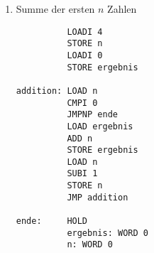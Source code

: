\documentclass{lehramt-informatik-haupt}
\begin{document}
\begin{enumerate}
\begin{enumerate}
\begin{multicols}{2}
\liSpaltenUmbruch
{}

\begin{verbatim}
PROGRAM groesser;
VAR x, y, ergebnis;
BEGIN
  IF x > y THEN
    ergebnis := 1;
  ELSE
    ergebnis := 0;
  END
END groesser.
\end{verbatim}
\vfill\strut
\end{multicols}

%

\item Bestimmung, ob eine Zahl gerade ist oder nicht.

\begin{multicols}{2}

\begin{verbatim}
          LOAD x
          MODI 2
          STORE hi$1
          LOAD hi$1
          CMPI 0
          JMPNZ M$1
          LOADI 1
          STORE ergebnis
          JMP M$2
M$1:      LOADI 0
          STORE ergebnis
M$2:      HOLD
x:        WORD 0
ergebnis: WORD 0
hi$1:     WORD 0
\end{verbatim}

\liSpaltenUmbruch
{}

\begin{verbatim}
PROGRAM gerade;
VAR x, ergebnis;
BEGIN
  IF x % 2 = 0 THEN
    ergebnis := 1;
  ELSE
    ergebnis := 0;
  END
END gerade.
\end{verbatim}
\vfill\strut
\end{multicols}

\end{enumerate}

%

\item Summe der ersten $n$ Zahlen

\begin{multicols}{2}

\begin{verbatim}
          LOADI 4
          STORE n
          LOADI 0
          STORE ergebnis

addition: LOAD n
          CMPI 0
          JMPNP ende
          LOAD ergebnis
          ADD n
          STORE ergebnis
          LOAD n
          SUBI 1
          STORE n
          JMP addition

ende:     HOLD
          ergebnis: WORD 0
          n: WORD 0
\end{verbatim}


\end{multicols}
\end{enumerate}
\end{document}
